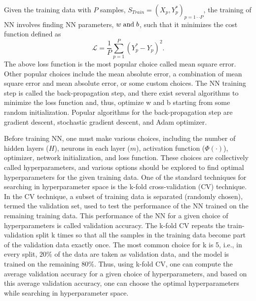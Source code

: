 Given the training data with $P$ samples, $S_{Train} = {(X_p,Y^*_p)}_{p=1 \cdot \cdot P}$, the training of NN involves finding NN parameters, $w {\;\text{and\;}} b$, such that it minimizes the cost function defined as 
\begin{equation}
\mathcal{L} = \frac{1}{P} \sum_{p=1}^{P}\left(Y^*_p - Y_p \right)^2.
\label{c7:eq_cost}
\end{equation}
The above loss function is the most popular choice called mean square error. 
Other popular choices include the mean absolute error, a combination of mean square error and mean absolute error, or some custom choices.
The NN training step is called the back-propagation step, and there exist several algorithms to minimize the loss function and, thus, optimize w and b starting from some random initialization.
Popular algorithms for the back-propagation step are gradient descent, stochastic gradient descent, and Adam optimizer. 

Before training NN, one must make various choices, including the number of hidden layers ($H$), neurons in each layer ($m$), activation function ($\Phi(\cdot)$), optimizer, network initialization, and loss function.
These choices are collectively called hyperparameters, and various options should be explored to find optimal hyperparameters for the given training data.
One of the standard techniques for searching in hyperparameter space is the k-fold cross-validation (CV) technique\cite{goodfellow2016deep}.
In the CV technique, a subset of training data is separated (randomly chosen), termed the validation set, used to test the performance of the NN trained on the remaining training data. 
This performance of the NN for a given choice of hyperparameters is called validation accuracy. 
The k-fold CV repeats the train-validation split k times so that all the samples in the training data become part of the validation data exactly once.
The most common choice for k is 5, i.e., in every split, $20 \%$ of the data are taken as validation data, and the model is trained on the remaining $80 \%$. 
Thus, using k-fold CV, one can compute the average validation accuracy for a given choice of hyperparameters, and based on this average validation accuracy, one can choose the optimal hyperparameters while searching in hyperparameter space. 

